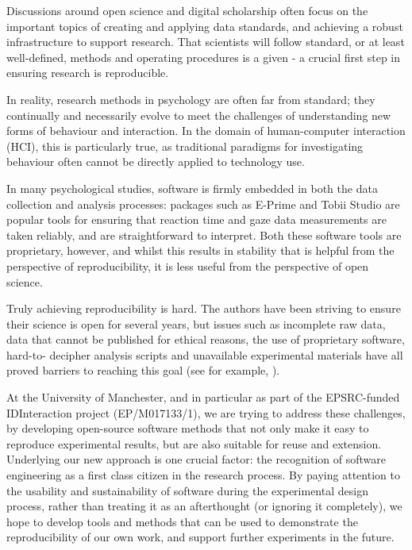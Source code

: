 \documentclass[a4paper,UKenglish]{dagrep}
\begin{document}
{}
\license
{}
Discussions around open science and digital scholarship often focus on the 
important topics of creating and applying data standards, and achieving a robust  
infrastructure to support research. That scientists will follow standard, or at 
least well-defined, methods and operating procedures is a given - a crucial first 
step in ensuring research is reproducible.

In reality, research methods in psychology are often far from standard; they 
continually and necessarily evolve to meet the challenges of understanding 
new forms of behaviour and interaction. In the domain of human-computer 
interaction (HCI), this is particularly true, as traditional paradigms for
investigating behaviour often cannot be directly applied to technology use.

In many psychological studies, software is firmly embedded in both the data 
collection and analysis processes: packages such as E-Prime and Tobii Studio are
popular tools for ensuring that reaction time and gaze data measurements are
taken reliably, and are straightforward to interpret. Both these software tools
are proprietary, however, and whilst this results in stability that is helpful from
the perspective of reproducibility, it is less useful from the perspective of open
science.

Truly achieving reproducibility is hard. The authors have been striving to ensure 
their science is open for several years, but issues such as incomplete raw data, data 
that cannot be published for ethical reasons, the use of proprietary software, hard-to-
decipher analysis scripts and unavailable experimental materials have all proved 
barriers to reaching this goal (see for example, \cite{Jay2013TR}).

At the University of Manchester, and in particular as part of the EPSRC-funded 
IDInteraction project (EP/M017133/1), we are trying to address these challenges, by 
developing open-source software methods that not only make it easy to 
reproduce experimental results, but are also suitable for reuse and extension. 
Underlying our new approach is one crucial factor: the recognition of software 
engineering as a first class citizen in the research process. By paying attention to the 
usability and sustainability of software during the 
experimental design process, rather than treating it as an afterthought (or ignoring 
it completely), we hope to develop tools and methods that can be used to demonstrate 
the reproducibility of our own work, and support further experiments in the future.
\end{document}
